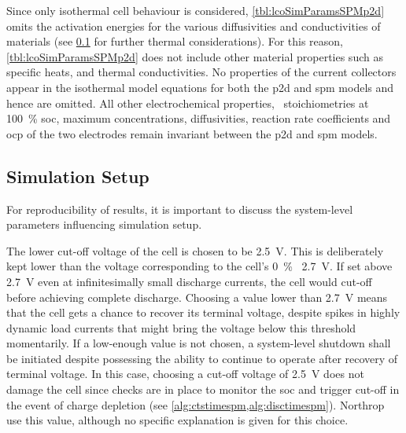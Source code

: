 
Since      only      isothermal      cell     behaviour      is      considered,
\cref{tbl:lcoSimParamsSPMp2d}    omits     the    activation     energies    for
the    various   diffusivities    and   conductivities    of   materials    (see
\cref{subsec:basicspmsimsetup}  for further  thermal  considerations). For  this
reason, \cref{tbl:lcoSimParamsSPMp2d} does not include other material properties
such as specific heats, and thermal conductivities. No properties of the current
collectors appear in  the isothermal model equations for both  the \gls{p2d} and
\gls{spm} models  and hence are  omitted. All other  electrochemical properties,
\viz~stoichiometries  at \SI{100}{\percent}  \gls{soc}, maximum  concentrations,
diffusivities, reaction  rate coefficients and  \gls{ocp} of the  two electrodes
remain invariant between the \gls{p2d} and \gls{spm} models.

\subsection{Simulation Setup}\label{subsec:basicspmsimsetup}

For  reproducibility of  results, it  is important  to discuss  the system-level
parameters influencing simulation setup.

The lower  cut-off voltage  of the  cell is chosen  to be  \SI{2.5}{\volt}. This
is  deliberately  kept  lower  than  the voltage  corresponding  to  the  cell's
\SI{0}{\percent} \ie~\SI{2.7}{\volt}.  If set  above  \SI{2.7}{\volt}  even
at  infinitesimally small  discharge  currents, the  cell  would cut-off  before
achieving complete discharge. Choosing a value lower than \SI{2.7}{V} means that
the cell gets a chance to recover its terminal voltage, despite spikes in highly
dynamic  load  currents  that  might  bring the  voltage  below  this  threshold
momentarily. If a low-enough value is  not chosen, a system-level shutdown shall
be  initiated  despite possessing  the  ability  to  continue to  operate  after
recovery  of terminal  voltage.  In this  case, choosing  a  cut-off voltage  of
\SI{2.5}{\volt} does  not damage the cell  since checks are in  place to monitor
the  \gls{soc}  and trigger  cut-off  in  the  event  of charge  depletion  (see
\cref{alg:ctstimespm,alg:disctimespm}).  Northrop~\etal~\cite{Northrop2011}  use
this value, although no specific explanation is given for this choice.

